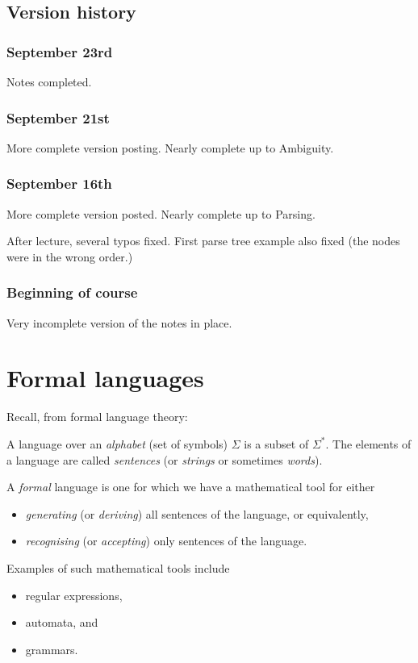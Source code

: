 \documentclass[11pt]{article}
\theoremstyle{definition}
\begin{document}
\subsection{Version history}
\label{sec:orgffed929}
\subsubsection{September 23rd}
\label{sec:orgd6a7840}
Notes completed.

\subsubsection{September 21st}
\label{sec:org309c1d6}
More complete version posting. Nearly complete up to
Ambiguity.

\subsubsection{September 16th}
\label{sec:org06f0419}
More complete version posted. Nearly complete up to Parsing.

After lecture, several typos fixed.
First parse tree example also fixed
(the nodes were in the wrong order.)

\subsubsection{Beginning of course}
\label{sec:org9541e3d}
Very incomplete version of the notes in place.

\section{Formal languages}
\label{sec:orge3162fa}
Recall, from formal language theory:

A language over an \emph{alphabet} (set of symbols) \(Σ\)
is a subset of \(Σ^{*}\).
The elements of a language are called \emph{sentences}
(or \emph{strings} or sometimes \emph{words}).

A \emph{formal} language is one for which we have a mathematical tool
for either
\begin{itemize}
\item \emph{generating} (or \emph{deriving}) all sentences of the language,
or equivalently,
\item \emph{recognising} (or \emph{accepting}) only sentences of the language.
\end{itemize}

Examples of such mathematical tools include
\begin{itemize}
\item regular expressions,
\item automata, and
\item grammars.
\end{itemize}
\end{document}
